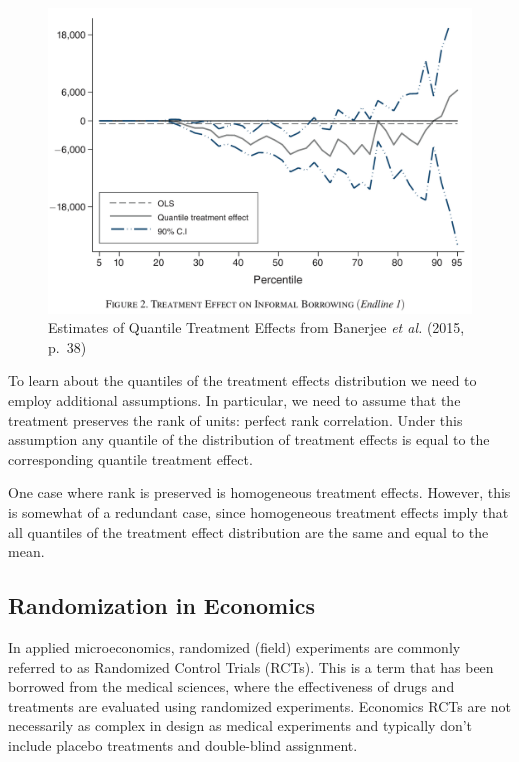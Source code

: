 \documentclass[
  letterpaper,
  DIV=11,
  numbers=noendperiod]{scrreprt}
\theoremstyle{definition}
\theoremstyle{remark}
\begin{document}
\begin{figure}[H]

{\centering \includegraphics{Images/Banerjee_p38.png}

}

\caption{Estimates of Quantile Treatment Effects from Banerjee \emph{et
al.} (2015, p.~38)}

\end{figure}%

To learn about the quantiles of the treatment effects distribution we
need to employ additional assumptions. In particular, we need to assume
that the treatment preserves the rank of units: perfect rank
correlation. Under this assumption any quantile of the distribution of
treatment effects is equal to the corresponding quantile treatment
effect.

One case where rank is preserved is homogeneous treatment effects.
However, this is somewhat of a redundant case, since homogeneous
treatment effects imply that all quantiles of the treatment effect
distribution are the same and equal to the mean.

\subsection{Randomization in
Economics}\label{randomization-in-economics}

In applied microeconomics, randomized (field) experiments are commonly
referred to as Randomized Control Trials (RCTs). This is a term that has
been borrowed from the medical sciences, where the effectiveness of
drugs and treatments are evaluated using randomized experiments.
Economics RCTs are not necessarily as complex in design as medical
experiments and typically don't include placebo treatments and
double-blind assignment.
\end{document}
